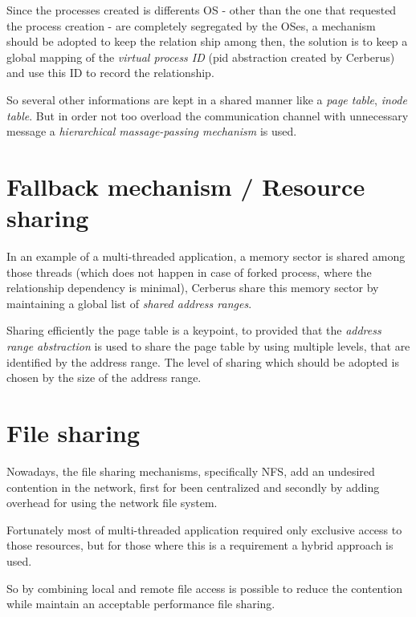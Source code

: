 \documentclass[journal]{IEEEtran}
\begin{document}
\begin{itemize}
	Since the processes created is differents OS - other than the one that requested the process creation - are completely segregated by the OSes, a mechanism should be adopted to keep the relation ship among then, the solution is to keep a global mapping of the \emph{virtual process ID} (pid abstraction created by Cerberus) and use this ID to record the relationship.
	
	So several other informations are kept in a shared manner like a \emph{page table}, \emph{inode table}. But in order not too overload the communication channel with unnecessary message a \emph{hierarchical massage-passing mechanism} is used.
	
	\section{Fallback mechanism / Resource sharing}
	
	In an example of a multi-threaded application, a memory sector is shared among those threads (which does not happen in case of forked process, where the relationship dependency is minimal), Cerberus share this memory sector by maintaining a global list of \emph{shared address ranges}.
	
	
	Sharing efficiently the page table is a keypoint, to provided that the \emph{address range abstraction} is used to share the page table by using multiple levels, that are identified by the address range. The level of sharing which should be adopted is chosen by the size of the address range.
	
	
	\section{File sharing}
	
	Nowadays, the file sharing mechanisms, specifically NFS, add an undesired contention in the network, first for been centralized and secondly by adding overhead for using the network file system. %
	
	Fortunately most of multi-threaded application required only exclusive access to those resources, but for those where this is a requirement a hybrid approach is used. 

	So by combining local and remote file access is possible to reduce the contention while maintain an acceptable performance file sharing. %
	

\end{itemize}
\end{document}
